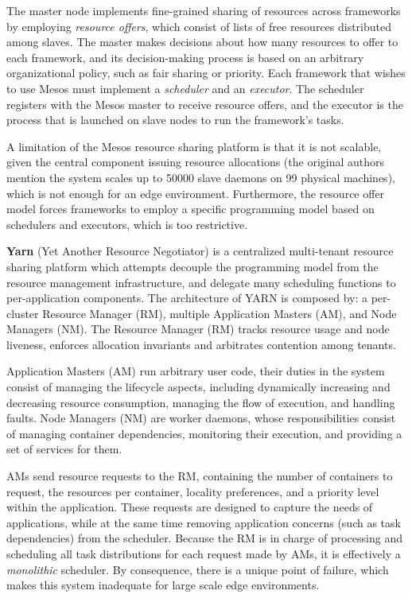 The master node implements fine-grained sharing of resources across frameworks by employing \textit{resource offers}, which consist of lists of free resources distributed among slaves. The master makes decisions about how many resources to offer to each framework, and its decision-making process is based on an arbitrary organizational policy, such as fair sharing or priority. Each framework that wishes to use Mesos must implement a \textit{scheduler} and an \textit{executor}. The scheduler registers with the Mesos master to receive resource offers, and the executor is the process that is launched on slave nodes to run the framework's tasks.

A limitation of the Mesos resource sharing platform is that it is not scalable, given the central component issuing resource allocations (the original authors mention the system scales up to 50000 slave daemons on 99 physical machines), which is not enough for an edge environment. Furthermore, the resource offer model forces frameworks to employ a specific programming model based on schedulers and executors, which is too restrictive. 

\textbf{Yarn} (Yet Another Resource Negotiator) \cite{Vavilapalli2013ApacheHY} is a centralized multi-tenant resource sharing platform which attempts decouple the programming model from the resource management infrastructure, and delegate many scheduling functions to per-application components. The architecture of YARN is composed by: a per-cluster Resource Manager (RM), multiple Application Masters (AM), and Node Managers (NM). The Resource Manager (RM) tracks resource usage and node liveness, enforces allocation invariants and arbitrates contention among tenants. 

Application Masters (AM) run arbitrary user code, their duties in the system consist of managing the lifecycle aspects, including dynamically increasing and decreasing resource consumption, managing the flow of execution, and handling faults. Node Managers (NM) are worker daemons, whose responsibilities consist of managing container dependencies, monitoring their execution, and providing a set of services for them. 

AMs send resource requests to the RM, containing the number of containers to request, the resources per container, locality preferences, and a priority level within the application. These requests are designed to capture the needs of applications, while at the same time removing application concerns (such as task dependencies) from the scheduler. Because the RM is in charge of processing and scheduling all task distributions for each request made by AMs, it is effectively a \textit{monolithic} scheduler. By consequence, there is a unique point of failure, which makes this system inadequate for large scale edge environments.


